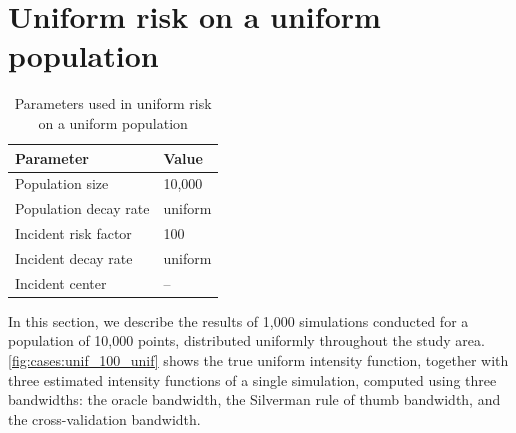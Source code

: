 \section{Uniform risk on a uniform population}
\label{sec:results:unif_100_unif}

\begin{table}[htbp]
\centering
\begin{tabular}{ll}
\hline
Parameter & Value \\
\hline
Population size & 10,000 \\
Population decay rate & uniform \\
Incident risk factor & 100 \\
Incident decay rate & uniform \\
Incident center & -- \\
\hline
\end{tabular}
\caption{Parameters used in uniform risk on a uniform population}
\label{tab:params:unif_100_unif}
\end{table}

In this section, we describe the results of 1,000 simulations conducted for a population of 10,000 points,
distributed uniformly throughout the study area.
\autoref{fig:cases:unif_100_unif} shows the true uniform intensity function,
together with three estimated intensity functions of a single simulation,
computed using three bandwidths: the oracle bandwidth, the Silverman rule of thumb bandwidth,
and the cross-validation bandwidth.


